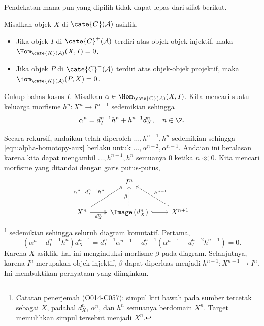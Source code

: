 Pendekatan mana pun yang dipilih tidak dapat lepas dari sifat berikut.

\begin{lema}\label{prop:resolution-homotopy-aux}
	Misalkan objek $X$ di $\cate{C}(\mathcal{A})$ asiklik.
	\begin{itemize}
		\item Jika objek $I$ di $\cate{C}^+(\mathcal{A})$ terdiri atas objek-objek injektif, maka $\Hom_{\cate{K}(\mathcal{A})}(X, I) = 0$.
		\item Jika objek $P$ di $\cate{C}^-(\mathcal{A})$ terdiri atas objek-objek projektif, maka $\Hom_{\cate{K}(\mathcal{A})}(P, X) = 0$.
	\end{itemize}
\end{lema}
\begin{bukti}
	Cukup bahas kasus $I$. Misalkan $\alpha \in \Hom_{\cate{C}(\mathcal{A})}(X,I)$. Kita mencari suatu keluarga morfisme $h^n: X^n \to I^{n-1}$ sedemikian sehingga
	\begin{equation}\label{eqn:alpha-homotopy-aux}
		\alpha^n = d_I^{n-1} h^n + h^{n+1} d_X^n , \quad n \in \Z.
	\end{equation}

	Secara rekursif, andaikan telah diperoleh $\ldots, h^{n-1}, h^n$ sedemikian sehingga \eqref{eqn:alpha-homotopy-aux} berlaku untuk $\ldots, \alpha^{n-2}, \alpha^{n-1}$. Andaian ini beralasan karena kita dapat mengambil $\ldots, h^{n-1}, h^n$ semuanya $0$ ketika $n \ll 0$. Kita mencari morfisme yang ditandai dengan garis putus-putus,
	\[\begin{tikzcd}[row sep=large]
		& I^n & \\
		X^n \arrow[twoheadrightarrow, r, "{d_X^n}"'] \arrow[ru, "{\alpha^n - d_I^{n-1} h^n}"] & \Image\left( d_X^n \right) \arrow[dashed, u, "\beta"] \arrow[hookrightarrow, r] & X^{n+1} \arrow[dashed, lu, "{h^{n+1}}"']
	\end{tikzcd}\]
\footnote{Catatan penerjemah (O014-C057): simpul kiri bawah pada sumber
tercetak sebagai $X$, padahal $d_X^n$, $\alpha^n$, dan $h^n$ semuanya
berdomain $X^n$. Target memulihkan simpul tersebut menjadi $X^n$.}
	sedemikian sehingga seluruh diagram komutatif. Pertama,
	\[ \left( \alpha^n - d_I^{n-1} h^n \right) d_X^{n-1} = d_I^{n-1} \alpha^{n-1} - d_I^{n-1} \left( \alpha^{n-1} - d_I^{n-2} h^{n-1} \right) = 0. \]
	Karena $X$ asiklik, hal ini menginduksi morfisme $\beta$ pada diagram. Selanjutnya, karena $I^n$ merupakan objek injektif, $\beta$ dapat diperluas menjadi $h^{n+1}: X^{n+1} \to I^n$. Ini membuktikan pernyataan yang diinginkan.
\end{bukti}

